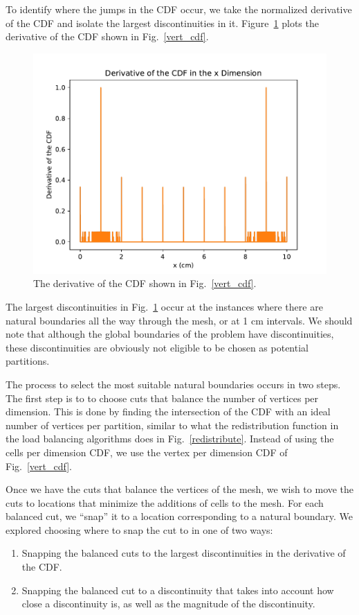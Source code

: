 To identify where the jumps in the CDF occur, we take the normalized derivative of the CDF and isolate the largest discontinuities in it. Figure~\ref{gradcdf} plots the derivative of the CDF shown in Fig.~\ref{vert_cdf}.
\begin{figure}[h]
\centering
\includegraphics[scale=0.75]{../figures/gradcdf.pdf}
\caption{The derivative of the CDF shown in Fig.~\ref{vert_cdf}.}
\label{gradcdf}
\end{figure}
The largest discontinuities in Fig.~\ref{gradcdf} occur at the instances where there are natural boundaries all the way through the mesh, or at 1 cm intervals.
We should note that although the global boundaries of the problem have discontinuities, these discontinuities are obviously not eligible to be chosen as potential partitions.

The process to select the most suitable natural boundaries occurs in two steps.
The first step is to to choose cuts that balance the number of vertices per dimension.
This is done by finding the intersection of the CDF with an ideal number of vertices per partition, similar to what the redistribution function in the load balancing algorithms does in Fig.~\ref{redistribute}.
Instead of using the cells per dimension CDF, we use the vertex per dimension CDF of Fig.~\ref{vert_cdf}.

Once we have the cuts that balance the vertices of the mesh, we wish to move the cuts to locations that minimize the additions of cells to the mesh.
For each balanced cut, we ``snap'' it to a location corresponding to a natural boundary.
We explored choosing where to snap the cut to in one of two ways:
\begin{enumerate}
  \item Snapping the balanced cuts to the largest discontinuities in the derivative of the CDF.
  \item Snapping the balanced cut to a discontinuity that takes into account how close a discontinuity is, as well as the magnitude of the discontinuity.
\end{enumerate}

